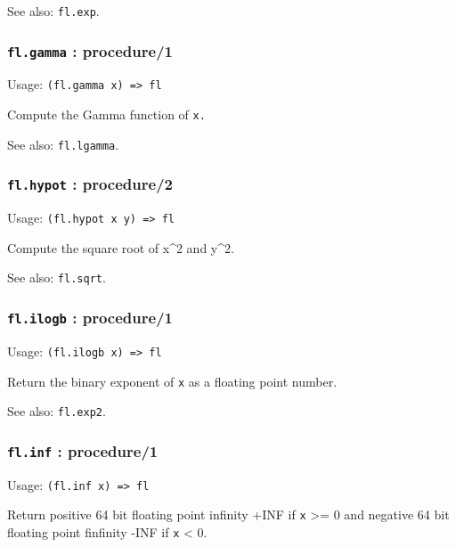 \documentclass[
]{article}
\newcommand{\passthrough}[1]{#1}
\begin{document}
See also: \passthrough{\lstinline!fl.exp!}.

\hypertarget{fl.gamma-procedure1}{%
\subsubsection{\texorpdfstring{\texttt{fl.gamma} :
procedure/1}{fl.gamma : procedure/1}}\label{fl.gamma-procedure1}}

Usage: \passthrough{\lstinline!(fl.gamma x) => fl!}

Compute the Gamma function of \passthrough{\lstinline!x.!}

See also: \passthrough{\lstinline!fl.lgamma!}.

\hypertarget{fl.hypot-procedure2}{%
\subsubsection{\texorpdfstring{\texttt{fl.hypot} :
procedure/2}{fl.hypot : procedure/2}}\label{fl.hypot-procedure2}}

Usage: \passthrough{\lstinline!(fl.hypot x y) => fl!}

Compute the square root of x\^{}2 and y\^{}2.

See also: \passthrough{\lstinline!fl.sqrt!}.

\hypertarget{fl.ilogb-procedure1}{%
\subsubsection{\texorpdfstring{\texttt{fl.ilogb} :
procedure/1}{fl.ilogb : procedure/1}}\label{fl.ilogb-procedure1}}

Usage: \passthrough{\lstinline!(fl.ilogb x) => fl!}

Return the binary exponent of \passthrough{\lstinline!x!} as a floating
point number.

See also: \passthrough{\lstinline!fl.exp2!}.

\hypertarget{fl.inf-procedure1}{%
\subsubsection{\texorpdfstring{\texttt{fl.inf} :
procedure/1}{fl.inf : procedure/1}}\label{fl.inf-procedure1}}

Usage: \passthrough{\lstinline!(fl.inf x) => fl!}

Return positive 64 bit floating point infinity +INF if
\passthrough{\lstinline!x!} \textgreater= 0 and negative 64 bit floating
point finfinity -INF if \passthrough{\lstinline!x!} \textless{} 0.
\end{document}
